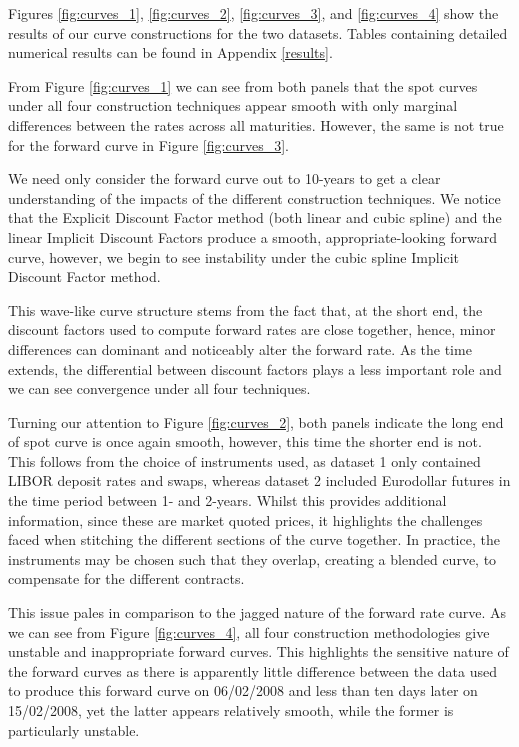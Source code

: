 Figures \ref{fig:curves_1}, \ref{fig:curves_2}, \ref{fig:curves_3}, and \ref{fig:curves_4} show the results of our curve constructions for the two datasets. Tables containing detailed numerical results can be found in Appendix \ref{results}. 

From Figure \ref{fig:curves_1} we can see from both panels that the spot curves under all four construction techniques appear smooth with only marginal differences between the rates across all maturities. However, the same is not true for the forward curve in Figure \ref{fig:curves_3}.

We need only consider the forward curve out to 10-years to get a clear understanding of the impacts of the different construction techniques. We notice that the Explicit Discount Factor method (both linear and cubic spline) and the linear Implicit Discount Factors produce a smooth, appropriate-looking forward curve, however, we begin to see instability under the cubic spline Implicit Discount Factor method. 

This wave-like curve structure stems from the fact that, at the short end, the discount factors used to compute forward rates are close together, hence,  minor differences can dominant and noticeably alter the forward rate. As the time extends, the differential between discount factors plays a less important role and we can see convergence under all four techniques. 

Turning our attention to Figure \ref{fig:curves_2}, both panels indicate the long end of spot curve is once again smooth, however, this time the shorter end is not. This follows from the choice of instruments used, as dataset 1 only contained LIBOR deposit rates and swaps, whereas dataset 2 included Eurodollar futures in the time period between 1- and 2-years. Whilst this provides additional information, since these are market quoted prices, it highlights the challenges faced when stitching the different sections of the curve together. In practice, the instruments may be chosen such that they overlap, creating a blended curve, to compensate for the different contracts.

This issue pales in comparison to the jagged nature of the forward rate curve. As we can see from Figure \ref{fig:curves_4}, all four construction methodologies give unstable and inappropriate forward curves. This highlights the sensitive nature of the forward curves as there is apparently little difference between the data used to produce this forward curve on 06/02/2008 and less than ten days later on 15/02/2008, yet the latter appears relatively smooth, while the former is particularly unstable.

